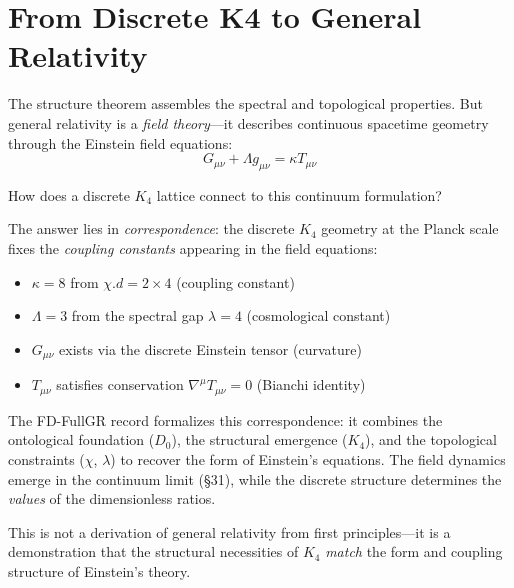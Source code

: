 \documentclass[11pt,a4paper]{book}
\def\cdot{.}%
\def\texttt#1{#1}%
\def\texorpdfstring#1#2{#2}%
\begin{document}
\section{From Discrete \texorpdfstring{$K_4$}{K4} to General Relativity}

The structure theorem assembles the spectral and topological properties. But general 
relativity is a \emph{field theory}—it describes continuous spacetime geometry through 
the Einstein field equations:
\[
G_{\mu\nu} + \Lambda g_{\mu\nu} = \kappa T_{\mu\nu}
\]

How does a discrete $K_4$ lattice connect to this continuum formulation?

The answer lies in \emph{correspondence}: the discrete $K_4$ geometry at the Planck scale 
fixes the \emph{coupling constants} appearing in the field equations:
\begin{itemize}
\item $\kappa = 8$ from $\chi \cdot d = 2 \times 4$ (coupling constant)
\item $\Lambda = 3$ from the spectral gap $\lambda = 4$ (cosmological constant)
\item $G_{\mu\nu}$ exists via the discrete Einstein tensor (curvature)
\item $T_{\mu\nu}$ satisfies conservation $\nabla^\mu T_{\mu\nu} = 0$ (Bianchi identity)
\end{itemize}

The \texttt{FD-FullGR} record formalizes this correspondence: it combines the ontological 
foundation ($D_0$), the structural emergence ($K_4$), and the topological constraints 
($\chi$, $\lambda$) to recover the form of Einstein's equations. The field dynamics 
emerge in the continuum limit (§31), while the discrete structure determines the 
\emph{values} of the dimensionless ratios.

This is not a derivation of general relativity from first principles—it is a 
demonstration that the structural necessities of $K_4$ \emph{match} the form and 
coupling structure of Einstein's theory.
\end{document}
